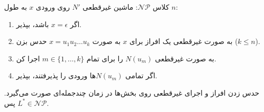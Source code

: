 {کلاس $\mathcal{NP}$:}
ماشین غیرقطعی $N'$ روی ورودی $x$ به طول $n$:
\begin{enumerate}
    \item اگر $x = \epsilon$ باشد، {بپذیر}.
    \item به صورت غیرقطعی یک افراز برای $x$ به صورت $x = u_1 u_2 \dots u_k$ حدس بزن ($k \le n$).
    \item به صورت غیرقطعی $N(u_m)$ را برای تمام $m \in \{1, \dots, k\}$ اجرا کن.
    \item اگر تمامی $N(u_m)$‌ها ورودی را پذیرفتند، {بپذیر}.
\end{enumerate}
حدس زدن افراز و اجرای غیرقطعی روی بخش‌ها در زمان چندجمله‌ای صورت می‌گیرد. پس $L^* \in \mathcal{NP}$.
